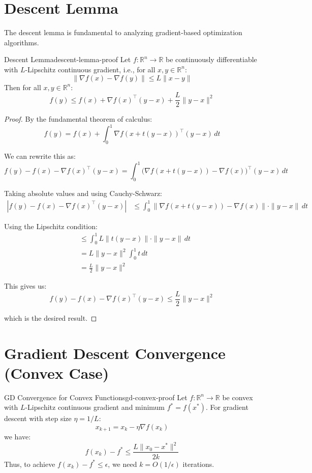 \documentclass[../main.tex]{subfiles}
\begin{document}
\section{Descent Lemma}\label{sec:proof-descent-lemma}

The descent lemma is fundamental to analyzing gradient-based optimization algorithms.

\begin{theorem}{Descent Lemma}{descent-lemma-proof}
Let $f: \mathbb{R}^n \to \mathbb{R}$ be continuously differentiable with $L$-Lipschitz continuous gradient, i.e., for all $x, y \in \mathbb{R}^n$:
\[
\|\nabla f(x) - \nabla f(y)\| \leq L\|x - y\|
\]
Then for all $x, y \in \mathbb{R}^n$:
\[
f(y) \leq f(x) + \nabla f(x)^\top(y - x) + \frac{L}{2}\|y - x\|^2
\]
\end{theorem}

\begin{proof}
By the fundamental theorem of calculus:
\[
f(y) = f(x) + \int_0^1 \nabla f(x + t(y-x))^\top (y-x) \, dt
\]

We can rewrite this as:
\[
f(y) - f(x) - \nabla f(x)^\top(y-x) = \int_0^1 \big(\nabla f(x + t(y-x)) - \nabla f(x)\big)^\top (y-x) \, dt
\]

Taking absolute values and using Cauchy-Schwarz:
\begin{align}
|f(y) - f(x) - \nabla f(x)^\top(y-x)| &\leq \int_0^1 \|\nabla f(x + t(y-x)) - \nabla f(x)\| \cdot \|y-x\| \, dt
\end{align}

Using the Lipschitz condition:
\begin{align}
&\leq \int_0^1 L\|t(y-x)\| \cdot \|y-x\| \, dt \\
&= L\|y-x\|^2 \int_0^1 t \, dt \\
&= \frac{L}{2}\|y-x\|^2
\end{align}

This gives us:
\[
f(y) - f(x) - \nabla f(x)^\top(y-x) \leq \frac{L}{2}\|y-x\|^2
\]

which is the desired result.
\end{proof}

\section{Gradient Descent Convergence (Convex Case)}\label{sec:proof-gd-convex}

\begin{theorem}{GD Convergence for Convex Functions}{gd-convex-proof}
Let $f: \mathbb{R}^n \to \mathbb{R}$ be convex with $L$-Lipschitz continuous gradient and minimum $f^* = f(x^*)$. For gradient descent with step size $\eta = 1/L$:
\[
x_{k+1} = x_k - \eta \nabla f(x_k)
\]
we have:
\[
f(x_k) - f^* \leq \frac{L\|x_0 - x^*\|^2}{2k}
\]
Thus, to achieve $f(x_k) - f^* \leq \epsilon$, we need $k = O(1/\epsilon)$ iterations.
\end{theorem}
\end{document}
